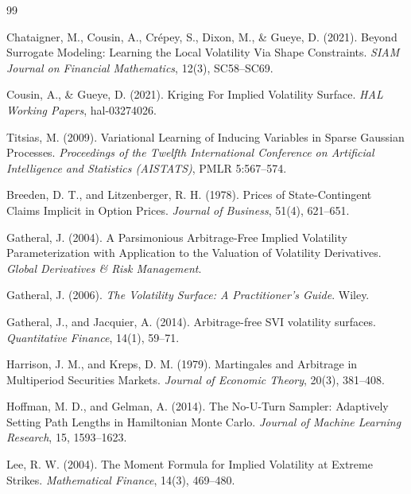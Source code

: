 \documentclass[12pt,oneside]{report}
\theoremstyle{definition}
\theoremstyle{remark}
\begin{document}
\begin{thebibliography}{99}

Chataigner, M., Cousin, A., Cr\'epey, S., Dixon, M., \& Gueye, D. (2021).
Beyond Surrogate Modeling: Learning the Local Volatility Via Shape Constraints.
\textit{SIAM Journal on Financial Mathematics}, 12(3), SC58--SC69.

Cousin, A., \& Gueye, D. (2021).
Kriging For Implied Volatility Surface.
\textit{HAL Working Papers}, hal-03274026.

Titsias, M. (2009).
Variational Learning of Inducing Variables in Sparse Gaussian Processes.
\textit{Proceedings of the Twelfth International Conference on Artificial Intelligence and Statistics (AISTATS)}, PMLR 5:567--574.

Breeden, D. T., and Litzenberger, R. H. (1978).
Prices of State-Contingent Claims Implicit in Option Prices.
\textit{Journal of Business}, 51(4), 621--651.

Gatheral, J. (2004).
A Parsimonious Arbitrage-Free Implied Volatility Parameterization with Application to the Valuation of Volatility Derivatives.
\textit{Global Derivatives \& Risk Management}.

Gatheral, J. (2006).
\textit{The Volatility Surface: A Practitioner's Guide}.
Wiley.

Gatheral, J., and Jacquier, A. (2014).
Arbitrage-free SVI volatility surfaces.
\textit{Quantitative Finance}, 14(1), 59--71.

Harrison, J. M., and Kreps, D. M. (1979).
Martingales and Arbitrage in Multiperiod Securities Markets.
\textit{Journal of Economic Theory}, 20(3), 381--408.

Hoffman, M. D., and Gelman, A. (2014).
The No-U-Turn Sampler: Adaptively Setting Path Lengths in Hamiltonian Monte Carlo.
\textit{Journal of Machine Learning Research}, 15, 1593--1623.

Lee, R. W. (2004).
The Moment Formula for Implied Volatility at Extreme Strikes.
\textit{Mathematical Finance}, 14(3), 469--480.


\end{thebibliography}
\end{document}
